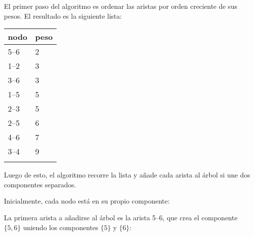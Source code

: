 \pagebreak
El primer paso del algoritmo es ordenar las aristas por orden
creciente de sus pesos. El resultado es la siguiente lista:

\begin{center}
    \begin{tabular}{ll}
        \\
        nodo & peso \\
        \hline
        5--6 & 2    \\
        1--2 & 3    \\
        3--6 & 3    \\
        1--5 & 5    \\
        2--3 & 5    \\
        2--5 & 6    \\
        4--6 & 7    \\
        3--4 & 9    \\
        \\
    \end{tabular}
\end{center}

Luego de esto, el algoritmo recorre la lista y añade cada arista
al árbol si une dos componentes separados.

Inicialmente, cada nodo está en su propio componente:
\begin{center}
\end{center}

La primera arista a añadirse al árbol es la arista 5--6, que crea el
componente $\{5,6\}$ uniendo los componentes $\{5\}$ y $\{6\}$:


